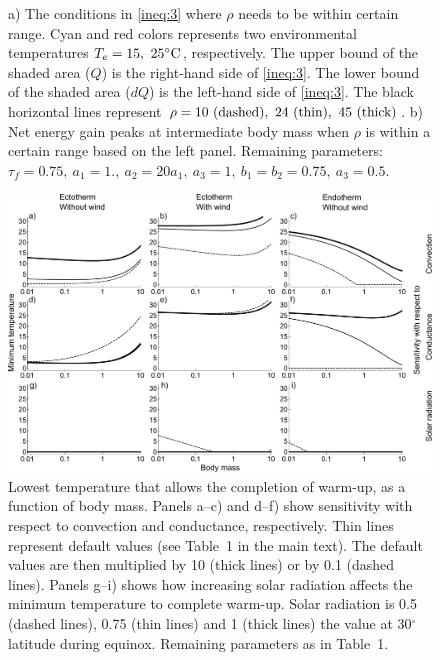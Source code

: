 \documentclass[11pt]{article}
\begin{document}
\begin{figure}
\begin{center}
	\caption{
		\setstretch{\stretchby}
		a) The conditions in \cref{ineq:3} where $\rho$ needs to be within certain range.
		Cyan and red colors represents two environmental temperatures $T_e = 15, \ 25^\circ \rm{C}$, respectively.
	  The upper bound of the shaded area ($Q$) is the right-hand side of \cref{ineq:3}.
	  The lower bound of the shaded area ($dQ$) is the left-hand side of \cref{ineq:3}.
	  The black horizontal lines represent $\rho = 10 \textnormal{ (dashed)}, \ 24 \textnormal{ (thin)}, \ 45 \textnormal{ (thick)}$.
	  b) Net energy gain peaks at intermediate body mass when $\rho$ is within a certain range based on the left panel.
	  Remaining parameters: $\tau_f = 0.75, \ a_1 = 1., \ a_2 = 20 a_1, \ a_3 = 1, \ b_1 = b_2 = 0.75, \ a_3 = 0.5$.
	}
	\label{fig:ana}
\end{center}
\end{figure}

\begin{figure}
    \includegraphics[width=\textwidth]{figS1} %
	\caption{
		\setstretch{\stretchby}
		Lowest temperature that allows the completion of warm-up, as a function of body mass.
		Panels a--c) and d--f) show sensitivity with respect to convection and conductance, respectively.
		Thin lines represent default values (see Table~1 in the main text).
		The default values are then multiplied by 10 (thick lines) or by 0.1 (dashed lines).
		Panels g--i) shows how increasing solar radiation affects the minimum temperature to complete warm-up.
		Solar radiation is 0.5 (dashed lines), 0.75 (thin lines) and 1 (thick lines) the value at 30$^\circ$ latitude during equinox.
		Remaining parameters as in Table~1.
	}
	\label{fig:min}
\end{figure}
\end{document}
